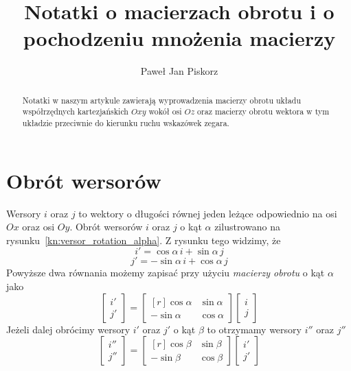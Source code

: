 \documentclass[12pt,a4paper,leqno]{article}
\title{Notatki o macierzach obrotu i o pochodzeniu mnożenia macierzy}
\author{Paweł Jan Piskorz}
\date{}
\numberwithin{equation}{section}
\begin{document}
\maketitle

\begin{abstract}
Notatki w naszym artykule zawierają wyprowadzenia macierzy obrotu układu współrzędnych kartezjańskich $Oxy$
wokół osi $Oz$ 
oraz macierzy obrotu wektora w tym układzie przeciwnie do kierunku ruchu wskazówek zegara.
\end{abstract}



\section{Obrót wersorów}\label{sec1}


Wersory $i$ oraz $j$ to wektory o długości równej jeden leżące odpowiednio na osi $Ox$ oraz osi $Oy$\@.
Obrót wersorów $i$ oraz $j$ o kąt $\alpha$ 
zilustrowano na rysunku~\ref{kn:versor_rotation_alpha}\@.
Z rysunku tego widzimy, że
\begin{equation}
i' = \cos \alpha \, i + \sin \alpha \, j    
\end{equation}
\begin{equation}
j' = -\sin \alpha \, i + \cos \alpha \, j    
\end{equation}
Powyższe dwa równania możemy zapisać przy użyciu {\em macierzy obrotu\/} o kąt $\alpha$ jako
\begin{equation}
\begin{bmatrix}
i' \\ 
j' 
\end{bmatrix}
=
\begin{bmatrix*}[r]
 \cos \alpha  & \sin \alpha  \\
-\sin \alpha  & \cos \alpha
\end{bmatrix*}
\begin{bmatrix}
i \\ 
j 
\end{bmatrix}
\end{equation}
Jeżeli dalej obrócimy wersory $i'$ oraz $j'$ o kąt $\beta$
to otrzymamy wersory $i''$ oraz $j''$
\begin{equation}
\begin{bmatrix}
i'' \\ 
j'' 
\end{bmatrix}
=
\begin{bmatrix*}[r]
 \cos \beta  & \sin \beta  \\
-\sin \beta  & \cos \beta
\end{bmatrix*}
\begin{bmatrix}
i' \\ 
j' 
\end{bmatrix}
\end{equation}
\end{document}
